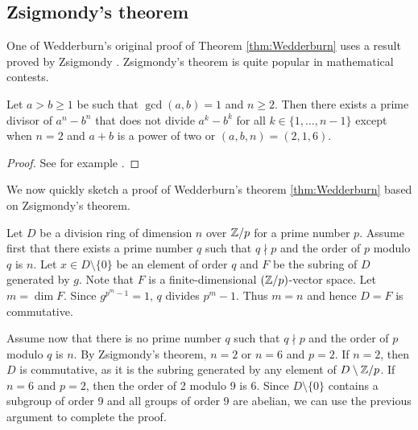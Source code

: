 \begin{graybox}
  \project
  \section{Zsigmondy's theorem}

  One of Wedderburn's original proof of Theorem \ref{thm:Wedderburn} 
  uses a 
  result proved
  by Zsigmondy \cite{MR1546236}. Zsigmondy's theorem is 
  quite popular in mathematical contests. 


  \begin{theorem}[Zsigmondy]
    Let $a>b\geq1$ be such that $\gcd(a,b)=1$ and $n\geq2$. 
    Then there exists a prime divisor of $a^n-b^n$ that does not
    divide $a^k-b^k$ for all $k\in\{1,\dots,n-1\}$ except 
    when $n=2$ and $a+b$ is a power of two or $(a,b,n)=(2,1,6)$. 
  \end{theorem}


  \begin{proof}
    See for example \cite{MR3172590}. 
  \end{proof}

  We now quickly sketch a proof of Wedderburn's theorem \ref{thm:Wedderburn} 
  based on Zsigmondy's theorem.  

  Let $D$ be a division ring of dimension $n$ over $\mathbb{Z}/p$ for a prime
  number $p$. Assume 
  first that there exists a prime number $q$ such that 
  $q\nmid p$ and the order of $p$ modulo $q$ is $n$. Let $x\in D\setminus\{0\}$ be an element of order $q$ and $F$ be the subring
  of $D$ generated by $g$. Note that $F$ is a finite-dimensional
  $(\mathbb{Z}/p)$-vector space. Let $m=\dim F$. 
  Since $g^{p^m-1}=1$, $q$ divides $p^m-1$. Thus $m=n$ and
  hence $D=F$ is commutative. 

  Assume now that there is no prime number $q$ such that 
  $q\nmid p$ and the order of $p$ modulo $q$ is $n$. By Zsigmondy's 
  theorem, $n=2$ or $n=6$ and $p=2$. If $n=2$, then 
  $D$ is commutative, as it is the subring generated by
  any element of $D\setminus \mathbb{Z}/p$. If $n=6$ and $p=2$, then 
  the order of 2 modulo 9 is 6. Since $D\setminus\{0\}$ contains
  a subgroup of order 9 and all groups of order 9 are abelian, 
  we can use the previous argument to complete the proof. 
\end{graybox}

